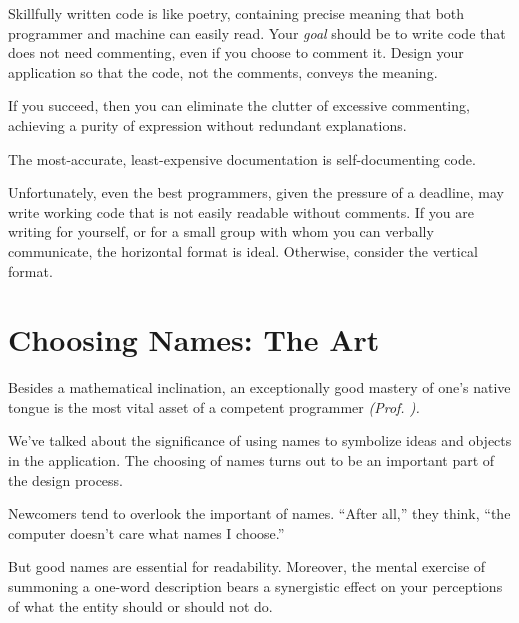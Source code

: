 Skillfully written \Forth{} code is like poetry, containing precise
meaning that both programmer and machine can easily read.  Your
\emph{goal} should be to write code that does not need commenting,
even if you choose to comment it.  Design your application so that the
code, not the comments, conveys the meaning.

If you succeed, then you can eliminate the clutter of excessive
commenting, achieving a purity of expression without redundant
explanations.


\begin{tip}
The most-accurate, least-expensive documentation
is self-documenting code.
\end{tip}
Unfortunately, even the best programmers, given the pressure of a
deadline, may write working code that is not easily readable without
comments.  If you are writing for yourself, or for a small group with
whom you can verbally communicate, the horizontal format is ideal.
Otherwise, consider the vertical format.%
%

\section{Choosing Names: The Art}%
%

\begin{tfquot}
Besides a mathematical inclination, an exceptionally good mastery of
one's native tongue is the most vital asset of a competent programmer
\emph{(Prof.   \cite{dijkstra82}).}
\end{tfquot}%
We've talked about the significance of using names to symbolize ideas
and objects in the application.  The choosing of names turns out to be
an important part of the design process.

Newcomers tend to overlook the important of names.  ``After all,''
they think, ``the computer doesn't care what names I choose.''

But good names are essential for readability.  Moreover, the mental
exercise of summoning a one-word description bears a synergistic effect
on your perceptions of what the entity should or should not do.

